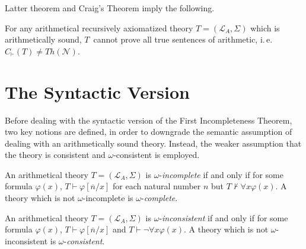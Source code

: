 Latter theorem and Craig's Theorem imply the following.

\begin{cor}
For any arithmetical recursively axiomatized theory $T= (\mathcal{L}_A, \Sigma)$ which is arithmetically sound, $T$~cannot prove all true sentences of arithmetic, i.\,e.\@ $C_\vdash(T)\neq\mathit{Th}(\mathcal{N})$.
\end{cor}


\section{The Syntactic Version}
Before dealing with the syntactic version of the First Incompleteness Theorem, two key notions are defined, in order to downgrade the semantic assumption of dealing with an arithmetically sound theory. Instead, the weaker assumption that the theory is consistent and $\omega$-consistent is employed. 

\begin{dfn}
An arithmetical theory $T= (\mathcal{L}_A, \Sigma)$ is $\omega$-\textit{incomplete} if and only if for some formula $\varphi(x)$, $T \vdash \varphi [\overline{n}/x]$ for each natural number $n$ but $T \nvdash \forall x  \varphi(x)$. A theory which is not $\omega$-incomplete is  $\omega$-\textit{complete}.
\end{dfn}

\begin{dfn}
An arithmetical theory $T= (\mathcal{L}_A, \Sigma)$ is $\omega$-\textit{inconsistent} if and only if for some formula $\varphi(x)$, $T \vdash \varphi[\overline{n}/x]$ and $T \vdash \lnot \forall x  \varphi(x)$. A theory which is not $\omega$-inconsistent is  $\omega$-\textit{consistent}.
\end{dfn}

